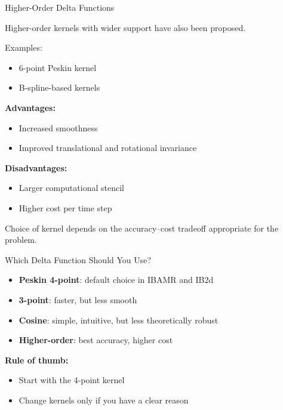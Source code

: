 \documentclass{beamer}
\begin{document}
\begin{frame}{Higher-Order Delta Functions}

Higher-order kernels with wider support have also been proposed.

\medskip

Examples:
\begin{itemize}
    \item 6-point Peskin kernel
    \item B-spline-based kernels
\end{itemize}

\medskip

\textbf{Advantages:}
\begin{itemize}
    \item Increased smoothness
    \item Improved translational and rotational invariance
\end{itemize}

\medskip

\textbf{Disadvantages:}
\begin{itemize}
    \item Larger computational stencil
    \item Higher cost per time step
\end{itemize}

\medskip

Choice of kernel depends on the accuracy–cost tradeoff
appropriate for the problem.

\end{frame}

\begin{frame}{Which Delta Function Should You Use?}

\begin{itemize}
    \item \textbf{Peskin 4-point}: default choice in IBAMR and IB2d
    \item \textbf{3-point}: faster, but less smooth
    \item \textbf{Cosine}: simple, intuitive, but less theoretically robust
    \item \textbf{Higher-order}: best accuracy, higher cost
\end{itemize}

\medskip

\textbf{Rule of thumb:}
\begin{itemize}
    \item Start with the 4-point kernel
    \item Change kernels only if you have a clear reason
\end{itemize}

\end{frame}
\end{document}
